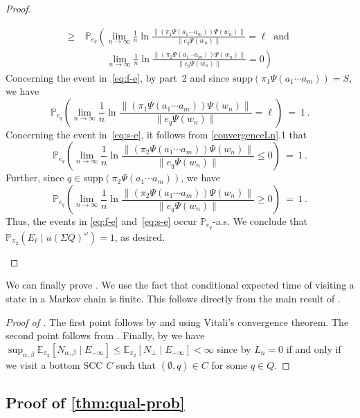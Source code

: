 \documentclass[a4paper,UKenglish,cleveref, autoref,mathscr]{lipics-v2019}
\newcommand{\EE}{\mathbb{E}}
\newcommand{\PP}{\mathbb{P}}
\newcommand{\1}{\mathbbm{1}}
\newcommand{\supp}{\mathrm{supp}}
\newcommand{\stefan}[1]{\marginpar{\textcolor{blue}{#1}}}
\renewcommand{\stefan}[1]{}
\begin{document}
\begin{proof}
\begin{enumerate}
\begin{align}
 \ge\ & \PP_{e_q}\left( \lim_{n \to \infty} \frac1n \ln \frac{\| (\pi_1 \Psi(a_1 \cdots a_m)) \Psi(w_n) \|}{ \| e_{q} \Psi(w_n) \|} = \ell \ \text{ and } \right. \label{eq:f-e}\\
      & \qquad\ \left. \lim_{n \to \infty} \frac1n \ln \frac{\| (\pi_2 \Psi(a_1 \cdots a_m)) \Psi(w_n) \|}{ \| e_{q} \Psi(w_n) \|} = 0 \right) \label{eq:s-e}
\end{align}
Concerning the event in~\eqref{eq:f-e}, by part~2 and since $\supp(\pi_1 \Psi(a_1 \cdots a_m)) = S$, we have
\[
\PP_{e_q}\left( \lim_{n \to \infty} \frac1n \ln \frac{\| (\pi_1 \Psi(a_1 \cdots a_m)) \Psi(w_n) \|}{ \| e_{q} \Psi(w_n) \|} = \ell \right) \ = \ 1\,.
\]
Concerning the event in~\eqref{eq:s-e}, it follows from \cref{convergenceLn}.1 \stefan{better reference?} that
\[
\PP_{e_q}\left( \lim_{n \to \infty} \frac1n \ln \frac{\| (\pi_2 \Psi(a_1 \cdots a_m)) \Psi(w_n) \|}{ \| e_{q} \Psi(w_n) \|} \le 0 \right) \ = \ 1\,.
\]
Further, since $q \in \supp(\pi_2 \Psi(a_1 \cdots a_m))$, we have
\[
\PP_{e_q}\left( \lim_{n \to \infty} \frac1n \ln \frac{\| (\pi_2 \Psi(a_1 \cdots a_m)) \Psi(w_n) \|}{ \| e_{q} \Psi(w_n) \|} \ge 0 \right) \ = \ 1\,.
\]
Thus, the events in \eqref{eq:f-e} and~\eqref{eq:s-e} occur $\PP_{e_q}$-a.s.
We conclude that $\PP_{\pi_2}(E_\ell \mid u (\Sigma Q)^\omega) = 1$, as desired. \qedhere
\end{enumerate}
\end{proof}

We can finally prove . We use the fact that conditional expected time of visiting a state in a Markov chain is finite. This follows directly from the main result of \cite{shes13}.

\begin{proof}[Proof of ]
The first point follows by  and  using Vitali's convergence theorem. The second point follows from . Finally, by  we have $\sup_{\alpha, \beta}\EE_{\pi_2}[N_{\alpha, \beta} \mid E_{-\infty}] \leq \EE_{\pi_2}[N_\perp \mid E_{-\infty}] < \infty$ since by  $L_n = 0$ if and only if we visit a bottom SCC $C$ such that  $(\emptyset, q) \in C$ for some $q \in Q$. 
\end{proof}

\subsection{Proof of \cref{thm:qual-prob}} \label{app:thm-qual-prob}
\end{document}
